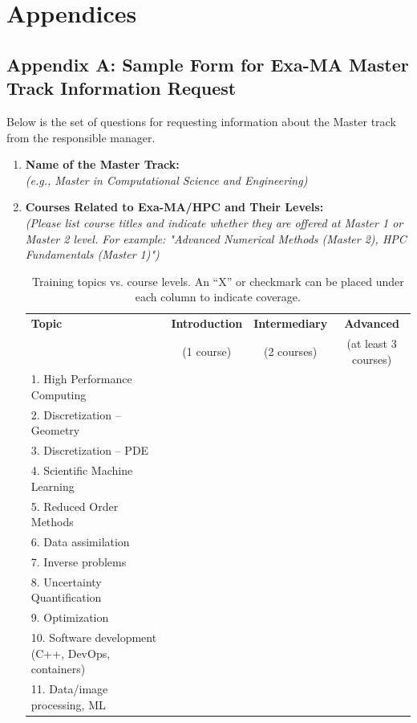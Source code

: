 
\clearpage
\appendix
\chapter{Appendices}
\section{Appendix A: Sample Form for Exa-MA Master Track Information Request}

Below is the set of questions for requesting information about the Master track from the responsible manager. 

\begin{enumerate}
    \item \textbf{Name of the Master Track:} \\
    \emph{(e.g., Master in Computational Science and Engineering)}
    
    \item \textbf{Courses Related to Exa-MA/HPC and Their Levels:} \\
    \emph{(Please list course titles and indicate whether they are offered at Master 1 or Master 2 level. For example: "Advanced Numerical Methods (Master 2), HPC Fundamentals (Master 1)")}
    

    \begin{table}[htbp]
        \centering
        \begin{tabular}{lccc}
        \toprule
        \textbf{Topic} & \textbf{Introduction} & \textbf{Intermediary} & \textbf{Advanced} \\
        & (1 course) & (2 courses) & (at least 3 courses) \\
        \midrule
        1. High Performance Computing &  &  &  \\
        2. Discretization -- Geometry &  &  &  \\
        3. Discretization -- PDE      &  &  &  \\
        4. Scientific Machine Learning &  &  &  \\
        5. Reduced Order Methods       &  &  &  \\
        6. Data assimilation           &  &  &  \\
        7. Inverse problems            &  &  &  \\
        8. Uncertainty Quantification  &  &  &  \\
        9. Optimization                &  &  &  \\
        10. Software development (C++, DevOps, containers) &  &  &  \\
        11. Data/image processing, ML  &  &  &  \\
        \bottomrule
        \end{tabular}
        \caption{Training topics vs. course levels. An “X” or checkmark can be placed under each column to indicate coverage.}
        \label{tab:training-topics}
        \end{table}


\end{enumerate}
